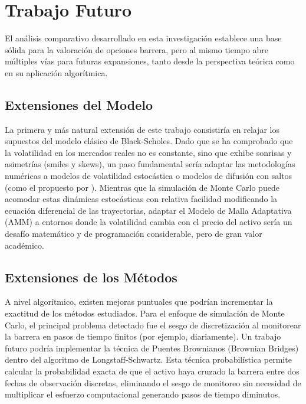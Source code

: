\section{Trabajo Futuro}
\label{sec:trabajo_futuro}

El análisis comparativo desarrollado en esta investigación establece una base sólida para la valoración de opciones barrera, pero al mismo tiempo abre múltiples vías para futuras expansiones, tanto desde la perspectiva teórica como en su aplicación algorítmica.

\subsection{Extensiones del Modelo}

La primera y más natural extensión de este trabajo consistiría en relajar los supuestos del modelo clásico de Black-Scholes. Dado que se ha comprobado que la volatilidad en los mercados reales no es constante, sino que exhibe sonrisas y asimetrías (smiles y skews), un paso fundamental sería adaptar las metodologías numéricas a modelos de volatilidad estocástica o modelos de difusión con saltos (como el propuesto por \cite{MERTON1976125}). Mientras que la simulación de Monte Carlo puede acomodar estas dinámicas estocásticas con relativa facilidad modificando la ecuación diferencial de las trayectorias, adaptar el Modelo de Malla Adaptativa (AMM) a entornos donde la volatilidad cambia con el precio del activo sería un desafío matemático y de programación considerable, pero de gran valor académico.

\subsection{Extensiones de los Métodos}

A nivel algorítmico, existen mejoras puntuales que podrían incrementar la exactitud de los métodos estudiados. Para el enfoque de simulación de Monte Carlo, el principal problema detectado fue el sesgo de discretización al monitorear la barrera en pasos de tiempo finitos (por ejemplo, diariamente). Un trabajo futuro podría implementar la técnica de Puentes Brownianos (Brownian Bridges) dentro del algoritmo de Longstaff-Schwartz. Esta técnica probabilística permite calcular la probabilidad exacta de que el activo haya cruzado la barrera entre dos fechas de observación discretas, eliminando el sesgo de monitoreo sin necesidad de multiplicar el esfuerzo computacional generando pasos de tiempo diminutos.

